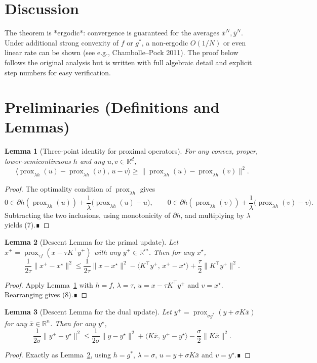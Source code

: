 \documentclass[11pt]{article}
\newtheorem{lemma}{Lemma}
\newcommand{\prox}{\operatorname{prox}}
\begin{document}
\section*{Discussion}
The theorem is *ergodic*: convergence is guaranteed for the averages $\bar{x}^{N},\bar{y}^{N}$. Under additional strong convexity of $f$ or $g^{*}$, a non‑ergodic $O(1/N)$ or even linear rate can be shown (see e.g., Chambolle–Pock 2011). The proof below follows the original analysis but is written with full algebraic detail and explicit step numbers for easy verification.

\newpage
\section*{Preliminaries (Definitions and Lemmas)}
\begin{lemma}[Three‑point identity for proximal operators]\label{lem:threepoint}
For any convex, proper, lower‑semicontinuous $h$ and any $u,v\in\mathbb{R}^{d}$,
\[
\langle \prox_{\lambda h}(u)-\prox_{\lambda h}(v),\,u-v\rangle
\ge \| \prox_{\lambda h}(u)-\prox_{\lambda h}(v) \|^{2}.
\tag{7}
\]
\end{lemma}
\begin{proof}
The optimality condition of $\prox_{\lambda h}$ gives
\[
0\in\partial h(\prox_{\lambda h}(u))+\frac{1}{\lambda}\big(\prox_{\lambda h}(u)-u\big),
\qquad
0\in\partial h(\prox_{\lambda h}(v))+\frac{1}{\lambda}\big(\prox_{\lambda h}(v)-v\big).
\]
Subtracting the two inclusions, using monotonicity of $\partial h$, and multiplying by $\lambda$ yields (7).∎
\end{proof}

\begin{lemma}[Descent Lemma for the primal update]\label{lem:primal}
Let $x^{+}= \prox_{\tau f}(x-\tau K^{\top}y^{+})$ with any $y^{+}\in\mathbb{R}^{m}$. Then for any $x^{\star}$,
\[
\frac{1}{2\tau}\|x^{+}-x^{\star}\|^{2}
\le \frac{1}{2\tau}\|x-x^{\star}\|^{2}
      -\langle K^{\top}y^{+},\,x^{+}-x^{\star}\rangle
      +\frac{\tau}{2}\|K^{\top}y^{+}\|^{2}.
\tag{8}
\]
\end{lemma}
\begin{proof}
Apply Lemma~\ref{lem:threepoint} with $h=f$, $\lambda=\tau$, $u=x-\tau K^{\top}y^{+}$ and $v=x^{\star}$. Rearranging gives (8).∎
\end{proof}

\begin{lemma}[Descent Lemma for the dual update]\label{lem:dual}
Let $y^{+}= \prox_{\sigma g^{*}}(y+\sigma K\bar{x})$ for any $\bar{x}\in\mathbb{R}^{n}$. Then for any $y^{\star}$,
\[
\frac{1}{2\sigma}\|y^{+}-y^{\star}\|^{2}
\le \frac{1}{2\sigma}\|y-y^{\star}\|^{2}
      +\langle K\bar{x},\,y^{+}-y^{\star}\rangle
      -\frac{\sigma}{2}\|K\bar{x}\|^{2}.
\tag{9}
\]
\end{lemma}
\begin{proof}
Exactly as Lemma~\ref{lem:primal}, using $h=g^{*}$, $\lambda=\sigma$, $u=y+\sigma K\bar{x}$ and $v=y^{\star}$.∎
\end{proof}
\end{document}
